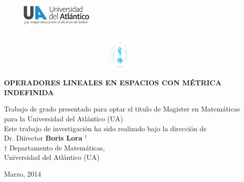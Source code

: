 \thispagestyle{empty}


\begin{center}

\vspace*{-0.5cm}

\begin{figure}[h]
\includegraphics[width=3.5cm, height=1.5cm]{./ps/logo3}\ \ \ \ \ \ \ \ \ \ \ \ \ \ \ \ \ \ \ \ \ \ \ \ \ \ \ \ \ \ \ \ \ \ \ \ \ \ \ \ \ \ \ \ \ \ \ \ \ \ \ \ \ \ \ \ \ \ \ \ \ \ \ \ \ \ \ \ \ \ \ \ \ \ \ \ \ \ \ \ \
\includegraphics[width=2.5cm, height=1.5cm]{./ps/escudoua}
  \end{figure}



\vspace{4.5cm}

\begin{large}
{\bf OPERADORES LINEALES EN ESPACIOS CON M\'ETRICA\\ INDEFINIDA}
\end{large}


\vspace{3cm}

\begin{center}
{\small\textsf{Trabajo de grado presentado para optar el titulo de Magister en Matem\'aticas\\para la Universidad del Atl\'antico (UA)\\[2ex]
Este trabajo de investigaci\'on ha sido realizado bajo la direcci\'on de\\
Dr. Diirector \textbf{Boris Lora} $^\dagger$\\[2ex]
$\dagger$ Departamento de Matem\'aticas,\\
Universidad del Atl\'antico (UA)}}
\end{center}



\vspace{3cm}

Marzo, 2014
\end{center}
